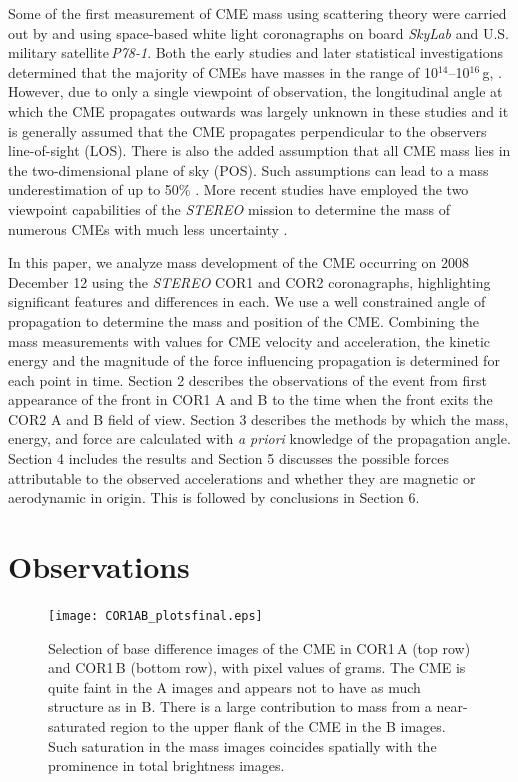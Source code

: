 \documentclass{emulateapj}
\begin{document}
Some of the first measurement of CME mass using scattering theory were carried out by \citet{munro1979} and \citet{poland1981} using space-based white light coronagraphs on board \emph{SkyLab} and U.S. military satellite\,\emph{P78-1}.  Both the early studies  and later statistical investigations determined that the majority of CMEs have masses in the range of 10$^{14}$--10$^{16}$\,g, \citep{vourlidas02, vour2010}. However, due to only a single viewpoint of observation, the longitudinal angle at which the CME propagates outwards was largely unknown in these studies and it is generally assumed that the CME propagates perpendicular to the observers line-of-sight (LOS). There is also the added assumption that all CME mass lies in the two-dimensional plane of sky (POS). Such assumptions can lead to a mass underestimation of up to 50\% \citep{vou00}. More recent studies have employed the two viewpoint capabilities of the \emph{STEREO} mission to determine the mass of numerous CMEs with much less uncertainty \citep{cola09}. 
	
In this paper, we analyze mass development of the CME occurring on 2008 December 12 using the \emph{STEREO} COR1 and COR2 coronagraphs, highlighting significant features and differences in each. We use a well constrained angle of propagation to determine the mass and position of the CME. Combining the mass measurements with values for CME velocity and acceleration, the kinetic energy and the magnitude of the force influencing propagation is determined for each point in time.  
Section 2 describes the observations of the event from first appearance of the front in COR1 A and B to the time when the front exits the COR2 A and B field of view. 
Section 3 describes the methods by which the mass, energy, and force are calculated with \emph{a priori} knowledge of the propagation angle. Section 4 includes the results and Section 5 discusses the possible forces attributable to the observed accelerations and whether they are magnetic or aerodynamic in origin. This is followed by conclusions in Section 6.

\section{Observations}
\begin{figure}
\texttt{[image: COR1AB\_plotsfinal.eps]}
\caption {Selection of base difference images of the CME in COR1\,A (top row) and COR1\,B (bottom row),  with pixel values of grams. The CME is quite faint in the A images and appears not to have as much structure as in B. There is a large contribution to mass from a near-saturated region to the upper flank of the CME in the B images. Such saturation in the mass images coincides spatially with the prominence in total brightness images.}
\label{fig:STEREO_COR1A&B.png}
\end{figure}
\end{document}
